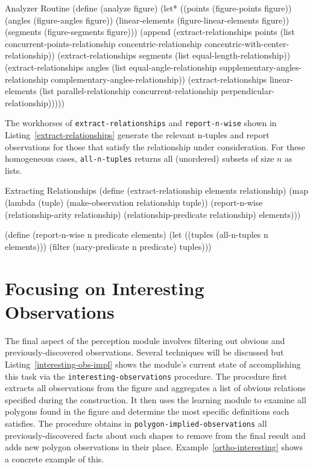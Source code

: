\begin{code-listing}
[label=analyzer]
{Analyzer Routine}
(define (analyze figure)
  (let* ((points (figure-points figure))
         (angles (figure-angles figure))
         (linear-elements (figure-linear-elements figure))
         (segments (figure-segments figure)))
    (append
     (extract-relationships points
                            (list concurrent-points-relationship
                                  concentric-relationship
                                  concentric-with-center-relationship))
     (extract-relationships segments
                             (list equal-length-relationship))
     (extract-relationships angles
                             (list equal-angle-relationship
                                   supplementary-angles-relationship
                                   complementary-angles-relationship))
     (extract-relationships linear-elements
                             (list parallel-relationship
                                   concurrent-relationship
                                   perpendicular-relationship)))))
\end{code-listing}

The workhorses of \texttt{extract-relationships} and
\texttt{report-n-wise} shown in Listing~\ref{extract-relationships}
generate the relevant n-tuples and report observations for those that
satisfy the relationship under consideration. For these homogeneous
cases, \texttt{all-n-tuples} returns all (unordered) subsets of size
$n$ as lists.

\begin{code-listing}
[label=extract-relationships]
{Extracting Relationships}
(define (extract-relationship elements relationship)
  (map (lambda (tuple)
         (make-observation relationship tuple))
       (report-n-wise
        (relationship-arity relationship)
        (relationship-predicate relationship)
        elements)))

(define (report-n-wise n predicate elements)
  (let ((tuples (all-n-tuples n elements)))
    (filter (nary-predicate n predicate) tuples)))
\end{code-listing}

\section{Focusing on Interesting Observations}

The final aspect of the perception module involves filtering out
obvious and previously-discovered observations.  Several techniques
will be discussed but Listing~\ref{interesting-obs-impl} shows the
module's current state of accomplishing this task via the
\texttt{interesting-observations} procedure. The procedure first
extracts all observations from the figure and aggregates a list of
obvious relations specified during the construction. It then uses the
learning module to examine all polygons found in the figure and
determine the most specific definitions each satisfies. The procedure
obtains in \texttt{polygon-implied-observations} all
previously-discovered facts about such shapes to remove from the final
result and adds new polygon observations in their
place. Example~\ref{ortho-interesting} shows a concrete example of this.

